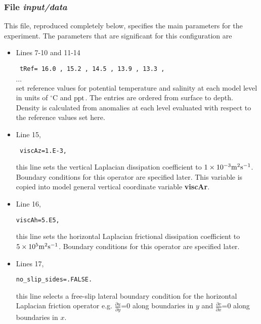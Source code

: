 \subsubsection{File {\it input/data}}
\label{www:tutorials}

This file, reproduced completely below, specifies the main parameters 
for the experiment. The parameters that are significant for this configuration
are

\begin{itemize}

\item Lines 7-10 and 11-14 
\begin{verbatim} tRef= 16.0 , 15.2 , 14.5 , 13.9 , 13.3 ,  \end{verbatim} 
$\cdots$ \\
set reference values for potential
temperature and salinity at each model level in units of $^{\circ}$C and
${\rm ppt}$. The entries are ordered from surface to depth.
Density is calculated from anomalies at each level evaluated
with respect to the reference values set here.\\


\item Line 15, 
\begin{verbatim} viscAz=1.E-3, \end{verbatim}
this line sets the vertical Laplacian dissipation coefficient to
$1 \times 10^{-3} {\rm m^{2}s^{-1}}$. Boundary conditions
for this operator are specified later. This variable is copied into
model general vertical coordinate variable {\bf viscAr}.


\item Line 16, 
\begin{verbatim}
viscAh=5.E5,
\end{verbatim} 
this line sets the horizontal Laplacian frictional dissipation coefficient to
$5 \times 10^{5} {\rm m^{2}s^{-1}}$. Boundary conditions
for this operator are specified later.

\item Lines 17,
\begin{verbatim}
no_slip_sides=.FALSE.
\end{verbatim}
this line selects a free-slip lateral boundary condition for
the horizontal Laplacian friction operator 
e.g. $\frac{\partial u}{\partial y}$=0 along boundaries in $y$ and
$\frac{\partial v}{\partial x}$=0 along boundaries in $x$.


\end{itemize}
